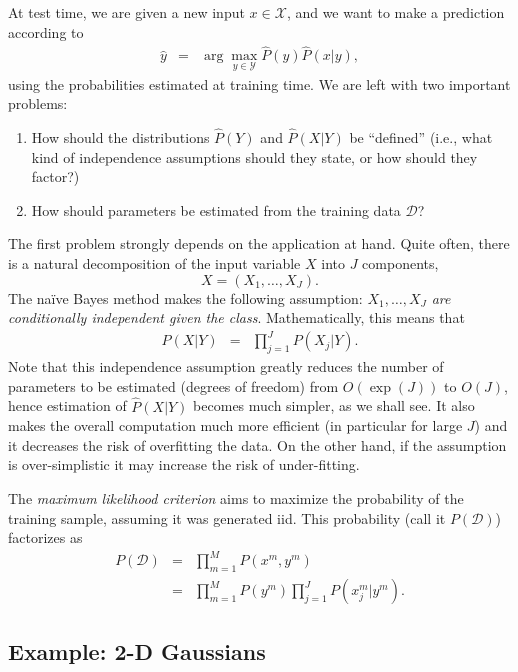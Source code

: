 At test time, we are given a new input $x \in \mathcal{X}$, and we want to make a prediction according to  
\begin{eqnarray}
{\hat y} &=& \arg\max_{y \in \mathcal{Y}} \hat{P}(y) \hat{P}(x|y),
\end{eqnarray}
using the probabilities estimated at training time. We are left with two important problems:
\begin{enumerate}
\item How should the distributions ${\hat P}(Y)$ and ${\hat P}(X|Y)$ be ``defined'' 
(i.e., what kind of independence assumptions should they state, or how should they factor?)
\item How should parameters be estimated from the training data $\mathcal{D}$?
\end{enumerate}
The first problem strongly depends on the application at hand. Quite often, there is a natural decomposition of the input variable $X$ into $J$ components, 
\begin{equation}
X = (X_1,\ldots,X_J). 
\end{equation}
The na\"{i}ve Bayes method makes the following assumption: \emph{$X_1,\ldots,X_J$ are conditionally independent given the class}. Mathematically, this means that 
\begin{eqnarray}
P(X|Y) &=& \prod_{j=1}^J P(X_j|Y).
\end{eqnarray}
Note that this independence assumption greatly reduces the number of parameters to be estimated (degrees of freedom) 
from $O(\exp(J))$ to $O(J)$, 
hence estimation of ${\hat P}(X|Y)$ becomes much simpler, as we shall see. 
It also makes the overall computation much more efficient 
(in particular for large $J$) and it decreases the risk of overfitting the data. 
On the other hand, if the assumption is over-simplistic it may increase the risk 
of under-fitting. 

The \emph{maximum likelihood criterion} 
aims to maximize the probability of the training sample, assuming it was generated iid. This probability (call it $P(\mathcal{D})$) factorizes as 
\begin{eqnarray}
P(\mathcal{D}) &=& \prod_{m=1}^M P(x^m,y^m) \nonumber\\
&=& \prod_{m=1}^M P(y^m)\prod_{j=1}^J P(x^m_j|y^m). 
\end{eqnarray}

\subsection{Example: 2-D Gaussians}

